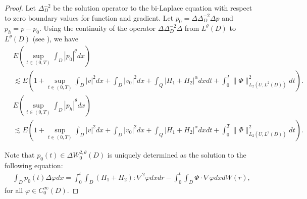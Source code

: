 \documentclass[reqno]{amsart}
\theoremstyle{definition}
\theoremstyle{remark}
\numberwithin{equation}{section} \allowdisplaybreaks
\begin{document}
\begin{proof}
Let $\Delta_D^{-2}$ be the solution operator to the bi-Laplace
equation with respect to zero boundary values for function and
gradient. Let $p_0=\Delta\Delta_D^{-2}\Delta p$ and $p_h=p-p_0$.
Using the continuity of the operator $\Delta\Delta_D^{-2}\Delta$
from $L^\theta(D)$ to $L^\theta(D)$ (see \cite{RM}), we have
\begin{equation}\label{3.3}
\begin{split}
&E\left(\sup_{t\in(0,T)}\int_{D}|p_0|^\theta dx\right)\\
&\lesssim
E\left(1+\sup_{t\in(0,T)}\int_{D}|v|^2dx+\int_{D}|v_0|^2dx+\int_Q|H_1+H_2|^\alpha
dxdt+\int_0^T\|\Phi\|^2_{L_2({U},L^2(D))}dt\right).
\end{split}
\end{equation}
\begin{equation}\label{3.4}
\begin{split}
&E\left(\sup_{t\in(0,T)}\int_{D}|p_h|^\theta dx\right)\\
&\lesssim
E\left(1+\sup_{t\in(0,T)}\int_{D}|v|^2dx+\int_{D}|v_0|^2dx+\int_Q|H_1+H_2|^\alpha
dxdt+\int_0^T\|\Phi\|^2_{L_2({U},L^2(D))}dt\right).
\end{split}
\end{equation}

Note that $p_0(t)\in \Delta W_0^{2,\theta}(D)$ is uniquely
determined as the solution to the following equation:
\begin{equation}\label{3.5}
\begin{split}
\int_{D}p_0(t)\Delta\varphi
dx=\int_0^t\!\!\!\int_{D}(H_1+H_2):\nabla^2\varphi
dxdr-\int_0^t\!\!\!\int_{D}\Phi\cdot\nabla\varphi dx dW(r),
\end{split}
\end{equation}
for all $\varphi\in C_0^\infty(D)$.


\end{proof}
\end{document}
